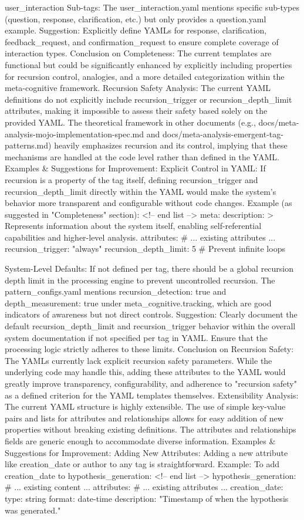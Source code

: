 {user_interaction Sub-tags: The user_interaction.yaml mentions specific sub-types (question, response, clarification, etc.) but only provides a question.yaml example.
Suggestion: Explicitly define YAMLs for response, clarification, feedback_request, and confirmation_request to ensure complete coverage of interaction types. Conclusion on Completeness: The current templates are functional but could be significantly enhanced by explicitly including properties for recursion control, analogies, and a more detailed categorization within the meta-cognitive framework.
Recursion Safety Analysis: The current YAML definitions do not explicitly include recursion_trigger or recursion_depth_limit attributes, making it impossible to assess their safety based solely on the provided YAML. The theoretical framework in other documents (e.g., docs/meta-analysis-mojo-implementation-spec.md and docs/meta-analysis-emergent-tag-patterns.md) heavily emphasizes recursion and its control, implying that these mechanisms are handled at the code level rather than defined in the YAML. Examples & Suggestions for Improvement:
Explicit Control in YAML: If recursion is a property of the tag itself, defining recursion_trigger and recursion_depth_limit directly within the YAML would make the system's behavior more transparent and configurable without code changes.
Example (as suggested in "Completeness" section): <!-- end list --> meta: description: > Represents information about the system itself, enabling self-referential capabilities and higher-level analysis. attributes: # ... existing attributes ... recursion_trigger: "always" recursion_depth_limit: 5 # Prevent infinite loops

System-Level Defaults: If not defined per tag, there should be a global recursion depth limit in the processing engine to prevent uncontrolled recursion. The pattern_configs.yaml mentions recursion_detection: true and depth_measurement: true under meta_cognitive.tracking, which are good indicators of awareness but not direct controls.
Suggestion: Clearly document the default recursion_depth_limit and recursion_trigger behavior within the overall system documentation if not specified per tag in YAML. Ensure that the processing logic strictly adheres to these limits. Conclusion on Recursion Safety: The YAMLs currently lack explicit recursion safety parameters. While the underlying code may handle this, adding these attributes to the YAML would greatly improve transparency, configurability, and adherence to "recursion safety" as a defined criterion for the YAML templates themselves.
Extensibility Analysis: The current YAML structure is highly extensible. The use of simple key-value pairs and lists for attributes and relationships allows for easy addition of new properties without breaking existing definitions. The attributes and relationships fields are generic enough to accommodate diverse information. Examples & Suggestions for Improvement:
Adding New Attributes: Adding a new attribute like creation_date or author to any tag is straightforward.
Example: To add creation_date to hypothesis_generation: <!-- end list --> hypothesis_generation: # ... existing content ... attributes: # ... existing attributes ... creation_date: type: string format: date-time description: "Timestamp of when the hypothesis was generated."

}
